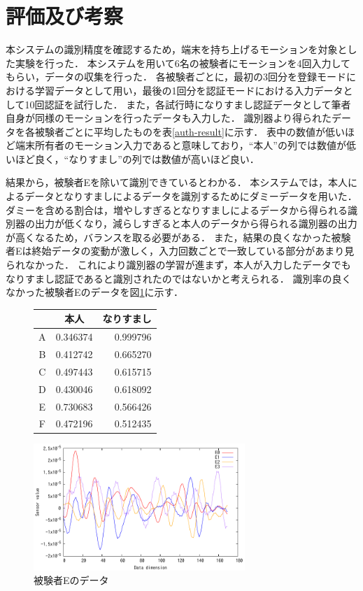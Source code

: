 \section{評価及び考察}
本システムの識別精度を確認するため，端末を持ち上げるモーションを対象とした実験を行った．
本システムを用いて6名の被験者にモーションを4回入力してもらい，データの収集を行った．
各被験者ごとに，最初の3回分を登録モードにおける学習データとして用い，最後の1回分を認証モードにおける入力データとして10回認証を試行した．
また，各試行時になりすまし認証データとして筆者自身が同様のモーションを行ったデータも入力した．
識別器より得られたデータを各被験者ごとに平均したものを表\ref{auth-result}に示す．
表中の数値が低いほど端末所有者のモーション入力であると意味しており，``本人''の列では数値が低いほど良く，``なりすまし''の列では数値が高いほど良い．

結果から，被験者Eを除いて識別できているとわかる．
本システムでは，本人によるデータとなりすましによるデータを識別するためにダミーデータを用いた．
ダミーを含める割合は，増やしすぎるとなりすましによるデータから得られる識別器の出力が低くなり，減らしすぎると本人のデータから得られる識別器の出力が高くなるため，バランスを取る必要がある．
また，結果の良くなかった被験者Eは終始データの変動が激しく，入力回数ごとで一致している部分があまり見られなかった．
これにより識別器の学習が進まず，本人が入力したデータでもなりすまし認証であると識別されたのではないかと考えられる．
識別率の良くなかった被験者Eのデータを図\ref{compare}に示す．

\begin{figure}[!tb]
  \def\@captype{table}
  \begin{minipage}{.48\textwidth}
    \centering
    \label{auth-result}
    \begin{tabular}{|c|r|r|} \hline
      \multicolumn{1}{|c|}{}  & \multicolumn{1}{c|}{本人} & \multicolumn{1}{c|}{なりすまし} \\ \hline \hline
      A & 0.346374 & 0.999796 \\ \hline
      B & 0.412742 & 0.665270 \\ \hline
      C & 0.497443 & 0.615715 \\ \hline
      D & 0.430046 & 0.618092 \\ \hline
      E & 0.730683 & 0.566426 \\ \hline
      F & 0.472196 & 0.512435 \\ \hline
    \end{tabular}
  \end{minipage}
  \hfill
  \begin{minipage}{.48\textwidth}
    \centering
    \includegraphics[bb=0 0 360 216, width=8cm]{Graphs/comp_E.pdf}
    \caption{被験者Eのデータ}
    \label{compare}
  \end{minipage}
\end{figure}
